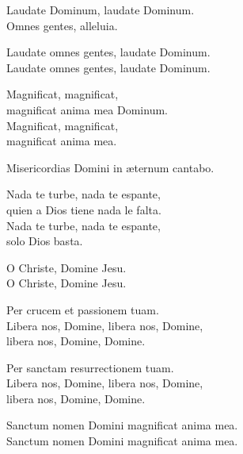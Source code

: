 \newpage


Laudate Dominum, laudate Dominum.\\
Omnes gentes, alleluia.

\spaziotaize


Laudate omnes gentes, laudate Dominum.\\
Laudate omnes gentes, laudate Dominum.

\spaziotaize


Magnificat, magnificat,\\
magnificat anima mea Dominum.\\
Magnificat, magnificat,\\
magnificat anima mea.

\spaziotaize


Misericordias Domini in \ae ternum cantabo.

\spaziotaize


Nada te turbe, nada te espante,\\
quien a Dios tiene nada le falta.\\
Nada te turbe, nada te espante,\\
solo Dios basta.

\spaziotaize


O Christe, Domine Jesu.\\
O Christe, Domine Jesu.

\spaziotaize


\strofa Per crucem et passionem tuam.\\
Libera nos, Domine, libera nos, Domine,\\
libera nos, Domine, Domine. 

\spazio

\strofa Per sanctam resurrectionem tuam.\\
Libera nos, Domine, libera nos, Domine,\\
libera nos, Domine, Domine.

\spaziotaize


Sanctum nomen Domini magnificat anima mea.\\
Sanctum nomen Domini magnificat anima mea.

